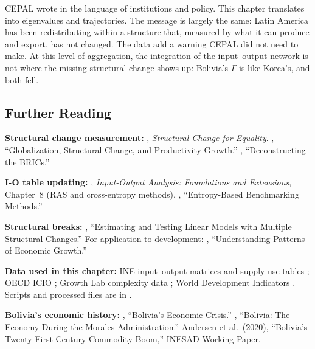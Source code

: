 \documentclass[../structural_economics_book.tex]{subfiles}
\begin{document}
CEPAL wrote in the language of institutions and policy. This chapter translates into eigenvalues and trajectories. The message is largely the same: Latin America has been redistributing within a structure that, measured by what it can produce and export, has not changed. The data add a warning CEPAL did not need to make. At this level of aggregation, the integration of the input--output network is not where the missing structural change shows up: Bolivia's $\Gamma$ is like Korea's, and both fell.


\subsection*{Further Reading}

\textbf{Structural change measurement:} \citet{cepal2012structural}, \textit{Structural Change for Equality}. \citet{mcmillan2014globalization}, ``Globalization, Structural Change, and Productivity Growth.'' \citet{devries2012deconstructing}, ``Deconstructing the BRICs.''

\textbf{I-O table updating:} \citet{miller2009inputoutput}, \textit{Input-Output Analysis: Foundations and Extensions}, Chapter~8 (RAS and cross-entropy methods). \citet{temursho2018entropy}, ``Entropy-Based Benchmarking Methods.''

\textbf{Structural breaks:} \citet{bai1998estimating}, ``Estimating and Testing Linear Models with Multiple Structural Changes.'' For application to development: \citet{pritchett2000understanding}, ``Understanding Patterns of Economic Growth.''

\textbf{Data used in this chapter:} INE input--output matrices and supply-use tables \citep{ine2026sut}; OECD ICIO \citep{oecd2021icio,oecd2023icio}; Growth Lab complexity data \citep{growthlab2026atlas}; World Development Indicators \citep{worldbank2026wdi}. Scripts and processed files are in .

\textbf{Bolivia's economic history:} \citet{morales1990bolivias}, ``Bolivia's Economic Crisis.'' \citet{weisbrot2009bolivia}, ``Bolivia: The Economy During the Morales Administration.'' Andersen et al.\ (2020), ``Bolivia's Twenty-First Century Commodity Boom,'' INESAD Working Paper.
\end{document}
